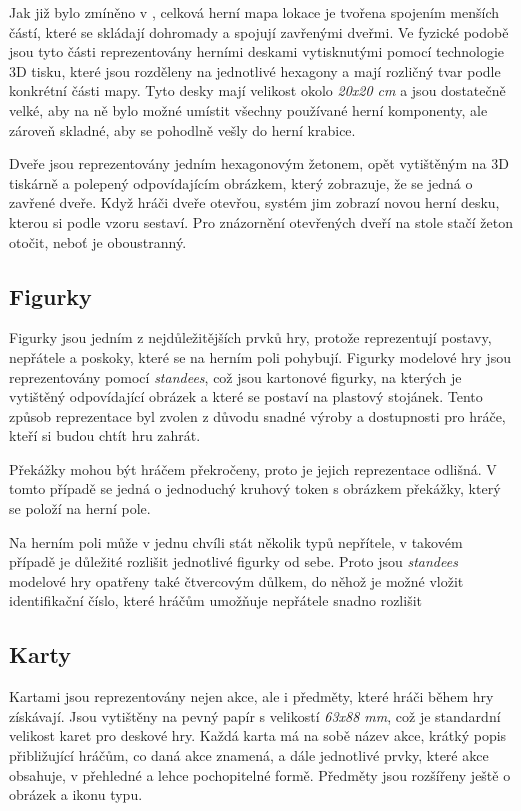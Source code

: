 Jak již bylo zmíněno v , celková herní mapa lokace je tvořena spojením menších částí, které se skládají dohromady a spojují zavřenými dveřmi. Ve fyzické podobě jsou tyto části reprezentovány herními deskami vytisknutými pomocí technologie 3D tisku, které jsou rozděleny na jednotlivé hexagony a mají rozličný tvar podle konkrétní části mapy. Tyto desky mají velikost okolo \textit{20x20 cm} a jsou dostatečně velké, aby na ně bylo možné umístit všechny používané herní komponenty, ale zároveň skladné, aby se pohodlně vešly do herní krabice.

Dveře jsou reprezentovány jedním hexagonovým žetonem, opět vytištěným na 3D tiskárně a polepený odpovídajícím obrázkem, který zobrazuje, že se jedná o zavřené dveře. Když hráči dveře otevřou, systém jim zobrazí novou herní desku, kterou si podle vzoru sestaví. Pro znázornění otevřených dveří na stole stačí žeton otočit, neboť je oboustranný.

\subsection{Figurky}
\label{subsec:design_figurines}

Figurky jsou jedním z nejdůležitějších prvků hry, protože reprezentují postavy, nepřátele a poskoky, které se na herním poli pohybují. Figurky modelové hry jsou reprezentovány pomocí \textit{standees}, což jsou kartonové figurky, na kterých je vytištěný odpovídající obrázek a které se postaví na plastový stojánek. Tento způsob reprezentace byl zvolen z důvodu snadné výroby a dostupnosti pro hráče, kteří si budou chtít hru zahrát.

Překážky mohou být hráčem překročeny, proto je jejich reprezentace odlišná. V tomto případě se jedná o jednoduchý kruhový token s obrázkem překážky, který se položí na herní pole.

Na herním poli může v jednu chvíli stát několik typů nepřítele, v takovém případě je důležité rozlišit jednotlivé figurky od sebe. Proto jsou \textit{standees} modelové hry opatřeny také čtvercovým důlkem, do něhož je možné vložit identifikační číslo, které hráčům umožňuje nepřátele snadno rozlišit

\subsection{Karty}
\label{subsec:design_cards}

Kartami jsou reprezentovány nejen akce, ale i předměty, které hráči během hry získávají. Jsou vytištěny na pevný papír s velikostí \textit{63x88 mm}, což je standardní velikost karet pro deskové hry. Každá karta má na sobě název akce, krátký popis přibližující hráčům, co daná akce znamená, a dále jednotlivé prvky, které akce obsahuje, v přehledné a lehce pochopitelné formě. Předměty jsou rozšířeny ještě o obrázek a ikonu typu.


